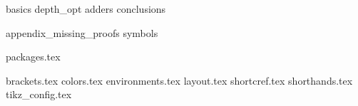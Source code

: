 {basics}
{depth_opt}
{adders}
{conclusions}

\FloatBarrier %

\begin{appendix}
{appendix_missing_proofs}
{symbols}
\end{appendix}





\samepage{

}


{packages.tex}

{brackets.tex}
{colors.tex}
{environments.tex}
{layout.tex}
{shortcref.tex}
{shorthands.tex}
{tikz_config.tex}

%
%
%

\newcommand{\bkt}[1]{\bktR{#1}}
\newcommand{\Bkt}[1]{\BktR{#1}}

\newcommand{\DBkt}[1]{\Bkt{\Bkt{#1}}}

\newcommand{\bktR}[1]{\setWithBracketsBase{(}{#1}{)}}
\newcommand{\BktR}[1]{\SetWithBracketsBase{(}{#1}{)}}

